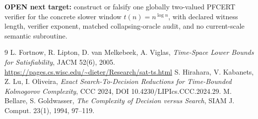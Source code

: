 \documentclass[11pt]{article}
\begin{document}
\textbf{OPEN next target:} construct or falsify one globally two-valued
PFCERT verifier for the concrete slower window $t(n)=n^{\log n}$, with
declared witness length, verifier exponent, matched collapsing-oracle audit,
and no current-scale semantic subroutine.

\begin{thebibliography}{9}
 L. Fortnow, R. Lipton, D. van Melkebeek, A. Viglas,
\emph{Time-Space Lower Bounds for Satisfiability}, JACM 52(6), 2005.
\url{https://pages.cs.wisc.edu/~dieter/Research/sat-ts.html}
 S. Hirahara, V. Kabanets, Z. Lu, I. Oliveira,
\emph{Exact Search-To-Decision Reductions for Time-Bounded Kolmogorov
Complexity}, CCC 2024, DOI 10.4230/LIPIcs.CCC.2024.29.
 M. Bellare, S. Goldwasser,
\emph{The Complexity of Decision versus Search}, SIAM J. Comput. 23(1),
1994, 97--119.
\end{thebibliography}
\end{document}
